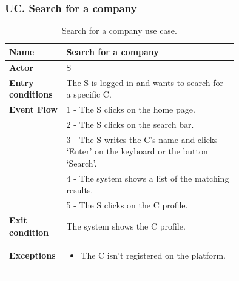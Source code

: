 \subsubsection*{UC\cuc . Search for a company}
\begin{center}
    \begin{longtable}{|l|p{0.75\linewidth}|}
        \hline
        \textbf{Name}               & Search for a company\\
        \hline
        \textbf{Actor}              & S\\
        \hline
        \textbf{Entry conditions}   & The S is logged in and wants to search for a specific C.\\
        \hline
        \textbf{Event Flow}         & 1 - The S clicks on the home page. \\
        & 2 - The S clicks on the search bar. \\
        & 3 - The S writes the C’s name and clicks ‘Enter’ on the keyboard or the button ‘Search’. \\
        & 4 - The system shows a list of the matching results. \\
        & 5 - The S clicks on the C profile. \\
        \hline
        \textbf{Exit condition}   & The system shows the C profile. \\       
        \hline
        \textbf{Exceptions}       & \begin{itemize}
            \item The C isn’t registered on the platform.
        \end{itemize}\\
        \hline
        \caption{Search for a company use case.}
        \label{tab: search_for_a_company_use_case}
    \end{longtable}
\end{center}


